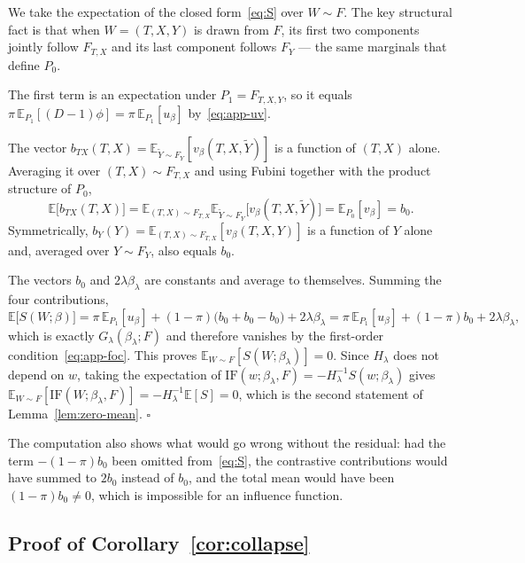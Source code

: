 \documentclass[11pt]{article}
\theoremstyle{plain}
\theoremstyle{definition}
\theoremstyle{remark}
\newcommand{\pE}{\ensuremath{\mathbb{E}}}
\newcommand{\ratio}{\ensuremath{\pi}}
\newcommand{\IF}{\mathrm{IF}}
\newcommand{\score}{S}
\begin{document}
We take the expectation of the closed form~\eqref{eq:S} over $W \sim F$. The key structural
fact is that when $W = (T,X,Y)$ is drawn from $F$, its first two components jointly follow
$F_{T,X}$ and its last component follows $F_Y$ --- the same marginals that define $P_0$.

The first term is an expectation under $P_1 = F_{T,X,Y}$, so it equals
$\ratio\,\pE_{P_1}[(D-1)\phi] = \ratio\,\pE_{P_1}[u_\beta]$ by~\eqref{eq:app-uv}.

The vector $b_{TX}(T,X) = \pE_{\widetilde Y \sim F_Y}[v_\beta(T,X,\widetilde Y)]$ is a function
of $(T,X)$ alone. Averaging it over $(T,X) \sim F_{T,X}$ and using Fubini together with the
product structure of $P_0$,
\[
\pE\big[ b_{TX}(T,X) \big]
= \pE_{(T,X) \sim F_{T,X}} \pE_{\widetilde Y \sim F_Y}\big[ v_\beta(T,X,\widetilde Y) \big]
= \pE_{P_0}[v_\beta] = b_0 .
\]
Symmetrically, $b_Y(Y) = \pE_{(T,X) \sim F_{T,X}}[v_\beta(T,X,Y)]$ is a function of $Y$ alone
and, averaged over $Y \sim F_Y$, also equals $b_0$.

The vectors $b_0$ and $2\lambda\beta_\lambda$ are constants and average to themselves. Summing
the four contributions,
\[
\pE\big[ \score(W;\beta) \big]
= \ratio\,\pE_{P_1}[u_\beta] + (1-\ratio)\big( b_0 + b_0 - b_0 \big) + 2\lambda\beta_\lambda
= \ratio\,\pE_{P_1}[u_\beta] + (1-\ratio)b_0 + 2\lambda\beta_\lambda,
\]
which is exactly $G_\lambda(\beta_\lambda;F)$ and therefore vanishes by the first-order
condition~\eqref{eq:app-foc}. This proves $\pE_{W\sim F}[\score(W;\beta_\lambda)] = 0$. Since
$H_\lambda$ does not depend on $w$, taking the expectation of
$\IF(w;\beta_\lambda,F) = -H_\lambda^{-1}\score(w;\beta_\lambda)$ gives
$\pE_{W\sim F}[\IF(W;\beta_\lambda,F)] = -H_\lambda^{-1}\pE[\score] = 0$, which is the second
statement of Lemma~\ref{lem:zero-mean}. \hfill$\square$

The computation also shows what would go wrong without the residual: had the term
$-(1-\ratio)b_0$ been omitted from~\eqref{eq:S}, the contrastive contributions would have summed
to $2b_0$ instead of $b_0$, and the total mean would have been $(1-\ratio)b_0 \neq 0$, which is
impossible for an influence function.

\subsection{Proof of Corollary~\ref{cor:collapse}}
\label{app:logistic-collapse}
\end{document}
